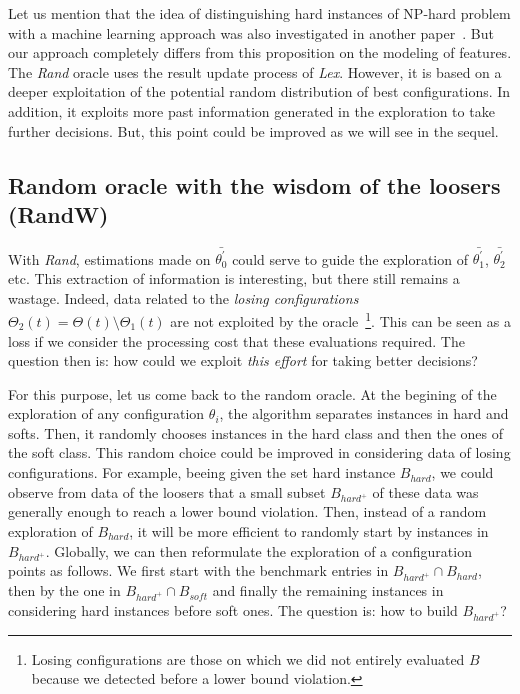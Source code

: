 \documentclass[10pt, conference, compsocconf]{IEEEtran}
\begin{document}
Let us mention that the idea of distinguishing hard instances of
NP-hard problem with a machine learning approach was also investigated
in another paper~\cite{WZZReport}. But our approach completely differs
from this proposition on the modeling of features.  The {\it Rand}
oracle uses the result update process of {\it Lex}. However, it is
based on a deeper exploitation of the potential random distribution of
best configurations. In addition, it exploits more past information
generated in the exploration to take further decisions. But, this
point could be improved as we will see in the sequel.

\subsection{Random oracle with the wisdom of the loosers (RandW)}

With {\it Rand}, estimations made on $\bar{\theta^{'}_0}$ could serve
to guide the exploration of $\bar{\theta^{'}_{1}}$,
$\bar{\theta^{'}_{2}}$ etc. This extraction of information is
interesting, but there still remains a wastage. Indeed, data related
to the {\it losing configurations}
$\Theta_2(t) = \Theta(t) \setminus \Theta_1(t)$ are not exploited by
the oracle~\footnote{Losing configurations are those on which we did
  not entirely evaluated $B$ because we detected before a lower bound
  violation.}.  This can be seen as a loss if we consider the
processing cost that these evaluations required. The question then is:
how could we exploit {\it this effort} for taking better decisions?

For this purpose, let us come back to the random oracle. At the
begining of the exploration of any configuration $\theta_i$, the
algorithm separates instances in hard and softs. Then, it randomly
chooses instances in the hard class and then the ones of the soft
class. This random choice could be improved in considering data of
losing configurations. For example, beeing given the set hard instance
$B_{hard}$, we could observe from data of the loosers that a small
subset $B_{hard^+}$ of these data was generally enough to reach a
lower bound violation. Then, instead of a random exploration of
$B_{hard}$, it will be more efficient to randomly start by instances
in $B_{hard^+}$.  Globally, we can then reformulate the exploration of
a configuration points as follows. We first start with the benchmark
entries in $B_{hard^+} \cap B_{hard}$, then by the one in
$B_{hard^+} \cap B_{soft}$ and finally the remaining instances in
considering hard instances before soft ones. The question is: how to
build $B_{hard^+}$?
\end{document}
